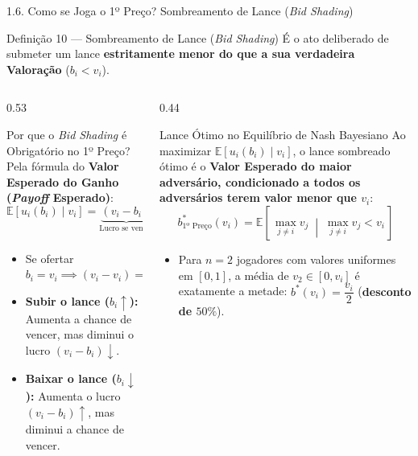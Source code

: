 \documentclass[aspectratio=169, 10pt]{beamer}
\newcommand{\defbox}[2]{%
  \begin{block}{#1}
    \footnotesize\setlength{\abovedisplayskip}{4pt}\setlength{\belowdisplayskip}{4pt}
    #2\par
  \end{block}%
}
\newcommand{\exbox}[2]{%
  \begin{exampleblock}{#1}
    \footnotesize\setlength{\abovedisplayskip}{4pt}\setlength{\belowdisplayskip}{4pt}
    #2\par
  \end{exampleblock}%
}
\begin{document}
\begin{frame}{1.6. Como se Joga o 1º Preço? Sombreamento de Lance
  (\textit{Bid Shading})}
  \defbox{Definição 10 --- Sombreamento de Lance (\textit{Bid Shading})}{%
    É o ato deliberado de submeter um lance \textbf{estritamente
    menor do que a sua verdadeira Valoração} ($b_i < v_i$).
  }
  \vspace{-0.05cm}
  \begin{columns}[T, onlytextwidth]
    \begin{column}{0.53\textwidth}
      \defbox{Por que o \textit{Bid Shading} é Obrigatório no 1º Preço?}{%
        Pela fórmula do \textbf{Valor Esperado do Ganho
        (\textit{Payoff} Esperado)}:
        \[
          \mathbb{E}[u_i(b_i) \mid v_i] = \underbrace{(v_i -
          b_i)}_{\text{Lucro se vencer}} \times
          \underbrace{\mathbb{P}\!\Big(b_i > \max_{j \neq i}
          b_j\Big)}_{\text{Probabilidade de vencer}}
        \]
      \begin{itemize}\setlength{\itemsep}{2pt}
          \item Se ofertar $b_i = v_i \implies (v_i - v_i) = 0
            \implies \textbf{Ganho esperado ZERO!}$
          \item \textbf{Subir o lance ($b_i \uparrow$):} Aumenta a
            chance de vencer, mas diminui o lucro $(v_i - b_i) \downarrow$.
          \item \textbf{Baixar o lance ($b_i \downarrow$):} Aumenta o
            lucro $(v_i - b_i) \uparrow$, mas diminui a chance de vencer.
        \end{itemize}
      }
    \end{column}
    \begin{column}{0.44\textwidth}
      \exbox{Lance Ótimo no Equilíbrio de Nash Bayesiano}{%
        Ao maximizar $\mathbb{E}[u_i(b_i) \mid v_i]$, o lance
        sombreado ótimo é o \textbf{Valor Esperado do maior
          adversário, condicionado a todos os adversários terem valor
        menor que $v_i$}:
        \[
          \boxed{b_{\text{1º Preço}}^\ast(v_i) = \mathbb{E}\!\left[\,
          \max_{j \neq i} v_j \;\middle|\; \max_{j \neq i} v_j < v_i \,\right]}
        \]
      \begin{itemize}\setlength{\itemsep}{2pt}
          \item Para $n=2$ jogadores com valores uniformes em
            $[0,1]$, a média de $v_2 \in [0, v_i]$ é exatamente a
            metade: $b^\ast(v_i) = \dfrac{v_i}{2}$ (\textbf{desconto
            de $50\%$}).
        \end{itemize}
      }
    \end{column}
  \end{columns}
\end{frame}
\end{document}
